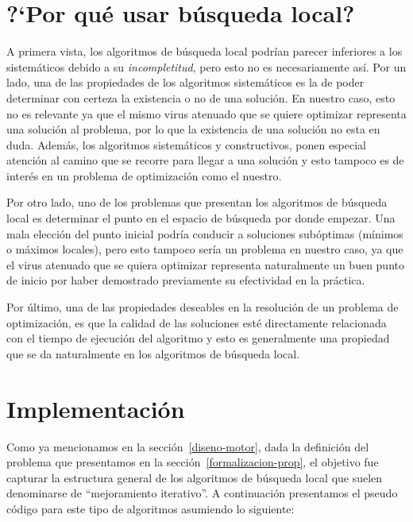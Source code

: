 \section{?`Por qu\'e usar b\'usqueda local?}

A primera vista, los algoritmos de b\'usqueda local podr\'ian parecer inferiores
a los sistem\'aticos debido a su \textit{incompletitud}, pero esto no es
necesariamente as\'i. Por un lado, una de las propiedades de los algoritmos
sistem\'aticos es la de poder determinar con certeza la existencia o no de una
soluci\'on. En nuestro caso, esto no es relevante ya que el mismo virus atenuado
que se quiere optimizar representa una soluci\'on al problema, por lo que la
existencia de una soluci\'on no esta en duda. Adem\'as, los algoritmos
sistem\'aticos y constructivos, ponen especial atenci\'on al camino que se
recorre para llegar a una soluci\'on y esto tampoco es de inter\'es en un
problema de optimizaci\'on como el nuestro.

Por otro lado, uno de los problemas que presentan los algoritmos de b\'usqueda
local es determinar el punto en el espacio de b\'usqueda por donde empezar. Una
mala elecci\'on del punto inicial podr\'ia conducir a soluciones sub\'optimas
(m\'inimos o m\'aximos locales), pero esto tampoco ser\'ia un problema en
nuestro caso, ya que el virus atenuado que se quiera optimizar representa
naturalmente un buen punto de inicio por haber demostrado previamente su
efectividad en la pr\'actica.

Por \'ultimo, una de las propiedades deseables en la resoluci\'on de un
problema de optimizaci\'on, es que la calidad de las soluciones est\'e
directamente relacionada con el tiempo de ejecuci\'on del algoritmo y esto es
generalmente una propiedad que se da naturalmente en los algoritmos de
b\'usqueda local.

\section{Implementaci\'on}

Como ya mencionamos en la secci\'on~\ref{diseno-motor}, dada la definici\'on
del problema que presentamos en la secci\'on~\ref{formalizacion-prop}, el
objetivo fue capturar la estructura general de los algoritmos de
b\'usqueda local que suelen denominarse de ``mejoramiento iterativo''. A
continuaci\'on presentamos el pseudo c\'odigo para este tipo de algoritmos
asumiendo lo siguiente:

